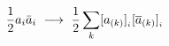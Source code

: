 \begin{equation}
{1\over 2} a_i \bar a_i ~ \longrightarrow ~ {1\over 2} \sum_{k} [a_{(k)}]_{_i} 
 [\overline a_{(k)}]_{_i}
\end{equation}

